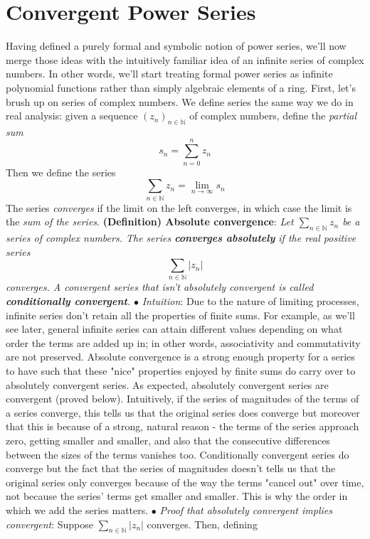 \documentclass{article}
\newcommand*{\tb}{\textbf}
\newcommand*{\ti}{\textit}
\newcommand*{\n}{\newline}
\newcommand*{\nn}{\newline \newline}
\newcommand*{\In}{\indent \ensuremath{\bullet} \textit{Intuition}: }
\newcommand*{\N}{\mathbb{N}}
\begin{document}
\section{Convergent Power Series}
Having defined a purely formal and symbolic notion of power series, we'll now merge those ideas with the intuitively familiar idea of an infinite series of complex numbers. In other words, we'll start treating formal power series as infinite polynomial functions rather than simply algebraic elements of a ring. First, let's brush up on series of complex numbers.
\n
We define series the same way we do in real analysis: given a sequence $ ( z_n )_{n \in \N} $ of complex numbers, define the \ti{partial sum}
    $$ s_n = \sum_{n = 0}^n z_n $$
Then we define the series
    $$ \sum_{n \in \N} z_n = \lim_{n \to \infty} s_n $$
The series \ti{converges} if the limit on the left converges, in which case the limit is the \ti{sum of the series}.
\nn
\tb{(Definition) Absolute convergence}: \ti{Let $ \sum_{n \in \N} z_n $ be a series of complex numbers. The series \tb{converges absolutely} if the real positive series}
    $$ \sum_{n \in \N} | z_n | $$
\indent \ti{converges. A convergent series that isn't absolutely convergent is called \tb{conditionally convergent}.}
\n
\In Due to the nature of limiting processes, infinite series don't retain all the properties of finite sums. For example, as we'll see later, general infinite series can attain different values depending on what order the terms are added up in; in other words, associativity and commutativity are not preserved. Absolute convergence is a strong enough property for a series to have such that these "nice" properties enjoyed by finite sums do carry over to absolutely convergent series. As expected, absolutely convergent series are convergent (proved below). Intuitively, if the series of magnitudes of the terms of a series converge, this tells us that the original series does converge but moreover that this is because of a strong, natural reason - the terms of the series approach zero, getting smaller and smaller, and also that the consecutive differences between the sizes of the terms vanishes too. Conditionally convergent series do converge but the fact that the series of magnitudes doesn't tells us that the original series only converges because of the way the terms "cancel out" over time, not because the series' terms get smaller and smaller. This is why the order in which we add the series matters.
\n
\indent $ \bullet $ \ti{Proof that absolutely convergent implies convergent}: Suppose $ \sum_{n \in \N} | z_n | $ converges. Then, defining
\end{document}
